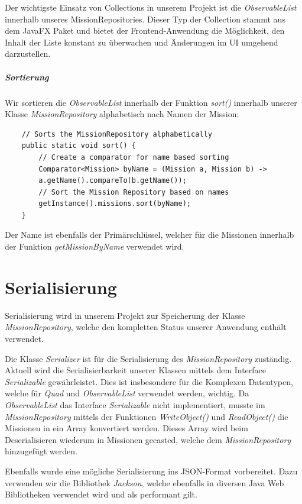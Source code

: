 Der wichtigste Einsatz von Collections in unserem Projekt ist die \textit{ObservableList} innerhalb unseres MissionRepositories.
Dieser Typ der Collection stammt aus dem JavaFX Paket und bietet der Frontend-Anwendung die Möglichkeit, den Inhalt der Liste konstant zu überwachen und Änderungen im UI umgehend darzustellen.


\subparagraph{Sortierung}

Wir sortieren die \textit{ObservableList} innerhalb der Funktion \textit{sort()} innerhalb unserer Klasse \textit{MissionRepository} alphabetisch nach Namen der Mission:


\begin{lstlisting}
	// Sorts the MissionRepository alphabetically
	public static void sort() {
		// Create a comparator for name based sorting 
		Comparator<Mission> byName = (Mission a, Mission b) ->
		a.getName().compareTo(b.getName());
		// Sort the Mission Repository based on names
		getInstance().missions.sort(byName);
	}
\end{lstlisting}

Der Name ist ebenfalls der Primärschlüssel, welcher für die Missionen innerhalb der Funktion \textit{getMissionByName} verwendet wird.

\section{Serialisierung}

Serialisierung wird in unserem Projekt zur Speicherung der Klasse \textit{MissionRepository}, welche den kompletten Status unserer Anwendung enthält verwendet.

Die Klasse \textit{Serializer} ist für die Serialisierung des \textit{MissionRepository} zuständig.
Aktuell wird die Serialisierbarkeit unserer Klassen mittels dem Interface \textit{Serializable} gewährleistet.
Dies ist insbesondere für die Komplexen Datentypen, welche für \textit{Quad} und \textit{ObservableList} verwendet werden, wichtig.
Da \textit{ObservableList} das Interface \textit{Serializable} nicht implementiert, musste im \textit{MissionRepository} mittels der Funktionen \textit{WriteObject()} und \textit{ReadObject()} die Missionen in ein Array konvertiert werden. Dieses Array wird beim Deserialisieren wiederum in Missionen gecasted, welche dem \textit{MissionRepository} hinzugefügt werden.

Ebenfalls wurde eine mögliche Serialisierung ins JSON-Format vorbereitet. Dazu verwenden wir die Bibliothek \textit{Jackson}, welche ebenfalls in diversen Java Web Bibliotheken verwendet wird und als performant gilt.

